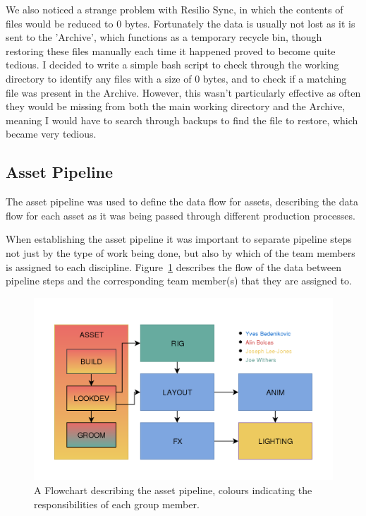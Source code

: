 \documentclass[11pt]{article}
\begin{document}
We also noticed a strange problem with Resilio Sync, in which the contents of files would be reduced to 0 bytes. Fortunately the data is usually not lost as it is sent to the 'Archive', which functions as a temporary recycle bin, though restoring these files manually each time it happened proved to become quite tedious. I decided to write a simple bash script to check through the working directory to identify any files with a size of 0 bytes, and to check if a matching file was present in the Archive. However, this wasn't particularly effective as often they would be missing from both the main working directory and the Archive, meaning I would have to search through backups to find the file to restore, which became very tedious.

\subsection{Asset Pipeline}

The asset pipeline was used to define the data flow for assets, describing the data flow for each asset as it was being passed through different production processes.

When establishing the asset pipeline it was important to separate pipeline steps not just by the type of work being done, but also by which of the team members is assigned to each discipline. Figure~\ref{figure:pipelineFlow} describes the flow of the data between pipeline steps and the corresponding team member(s) that they are assigned to.

\begin{figure}[htbp]\centering
	\includegraphics[width=1.0\linewidth]{images/pipeline.png}
	\caption{\label{figure:pipelineFlow} A Flowchart describing the asset pipeline, colours indicating the responsibilities of each group member.}
\end{figure}
\end{document}
